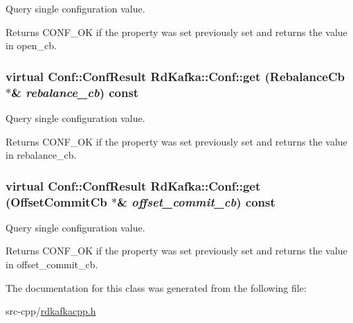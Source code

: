 Query single configuration value. \begin{DoxyReturn}{Returns}
CONF\_\-OK if the property was set previously set and returns the value in {\ttfamily open\_\-cb}. 
\end{DoxyReturn}
\hypertarget{classRdKafka_1_1Conf_a72e44c96b9ce99bec94456edfbef3007}{
\subsubsection[{get}]{\setlength{\rightskip}{0pt plus 5cm}virtual {\bf Conf::ConfResult} RdKafka::Conf::get ({\bf RebalanceCb} $\ast$\& {\em rebalance\_\-cb}) const}}
\label{classRdKafka_1_1Conf_a72e44c96b9ce99bec94456edfbef3007}


Query single configuration value. \begin{DoxyReturn}{Returns}
CONF\_\-OK if the property was set previously set and returns the value in {\ttfamily rebalance\_\-cb}. 
\end{DoxyReturn}
\hypertarget{classRdKafka_1_1Conf_a7c7b6f5814360e4163cc1e6da53f585f}{
\subsubsection[{get}]{\setlength{\rightskip}{0pt plus 5cm}virtual {\bf Conf::ConfResult} RdKafka::Conf::get ({\bf OffsetCommitCb} $\ast$\& {\em offset\_\-commit\_\-cb}) const}}
\label{classRdKafka_1_1Conf_a7c7b6f5814360e4163cc1e6da53f585f}


Query single configuration value. \begin{DoxyReturn}{Returns}
CONF\_\-OK if the property was set previously set and returns the value in {\ttfamily offset\_\-commit\_\-cb}. 
\end{DoxyReturn}


The documentation for this class was generated from the following file:\begin{DoxyCompactItemize}
\item 
src-\/cpp/\hyperlink{rdkafkacpp_8h}{rdkafkacpp.h}\end{DoxyCompactItemize}

